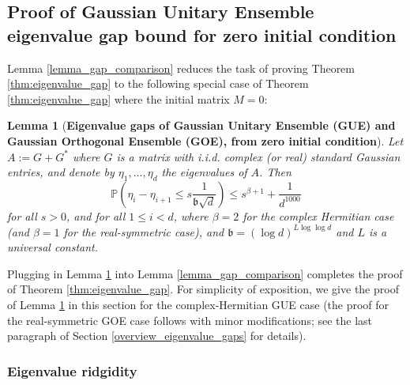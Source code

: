 \documentclass[11pt,letterpaper]{article}
\newtheorem{lemma}[theorem]{Lemma}
\begin{document}
\subsection{Proof of Gaussian Unitary Ensemble eigenvalue gap bound for zero initial condition}




 Lemma \ref{lemma_gap_comparison} reduces the task of proving Theorem \ref{thm:eigenvalue_gap} to the following special case of Theorem \ref{thm:eigenvalue_gap} where the initial matrix $M = 0$:

\begin{lemma}[\bf Eigenvalue gaps of  Gaussian Unitary Ensemble (GUE) and Gaussian Orthogonal Ensemble (GOE), from zero initial condition]\label{lemma_GUE_gaps}
%
%
%
Let $A := G + G^\ast$ where $G$ is a matrix with i.i.d. complex (or real) standard Gaussian entries, and denote by $\eta_1,\ldots, \eta_d$ the eigenvalues of $A$.
%
Then
%
%
$$
    \mathbb{P}\left(\eta_i - \eta_{i+1} \leq s \frac{1}{\mathfrak{b}\sqrt{d}}\right) \leq s^{\beta +1} + \frac{1}{d^{1000}}$$ for all $s>0$, and for all $1\leq i < d$,
where $\beta=2$ for the complex Hermitian case (and $\beta=1$ for the real-symmetric case), and $\mathfrak{b} = (\log d)^{ L\log \log d}$ and $L$ is a universal constant.
%
\end{lemma}

\noindent Plugging in Lemma \ref{lemma_GUE_gaps} into Lemma \ref{lemma_gap_comparison} completes the proof of Theorem \ref{thm:eigenvalue_gap}.
%
 For simplicity of exposition, we give the proof of Lemma \ref{lemma_GUE_gaps} in this section for the complex-Hermitian GUE case (the proof for the real-symmetric GOE case follows with minor modifications; see the last paragraph of Section \ref{overview_eigenvalue_gaps} for details).


\subsubsection{Eigenvalue ridgidity}
%
%
\end{document}

